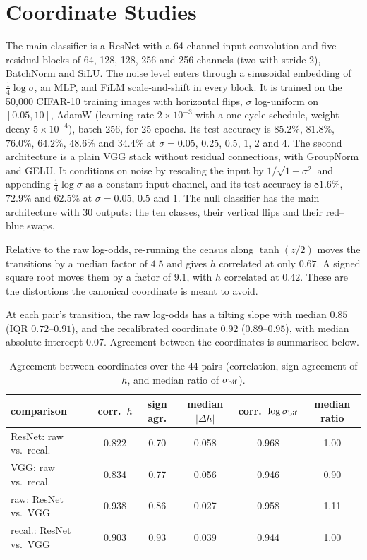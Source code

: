 \section{Coordinate Studies}
\label{app:coord}

The main classifier is a ResNet with a 64-channel input convolution and five residual blocks of 64, 128, 128, 256 and 256 channels (two with stride 2), BatchNorm and SiLU. The noise level enters through a sinusoidal embedding of $\frac14\log\sigma$, an MLP, and FiLM scale-and-shift in every block. It is trained on the 50{,}000 CIFAR-10 training images with horizontal flips, $\sigma$ log-uniform on $[0.05,10]$, AdamW (learning rate $2\times10^{-3}$ with a one-cycle schedule, weight decay $5\times10^{-4}$), batch 256, for 25 epochs. Its test accuracy is $85.2\%$, $81.8\%$, $76.0\%$, $64.2\%$, $48.6\%$ and $34.4\%$ at $\sigma=0.05$, $0.25$, $0.5$, $1$, $2$ and $4$. The second architecture is a plain VGG stack without residual connections, with GroupNorm and GELU. It conditions on noise by rescaling the input by $1/\sqrt{1+\sigma^2}$ and appending $\frac14\log\sigma$ as a constant input channel, and its test accuracy is $81.6\%$, $72.9\%$ and $62.5\%$ at $\sigma=0.05$, $0.5$ and $1$. The null classifier has the main architecture with 30 outputs: the ten classes, their vertical flips and their red–blue swaps.

Relative to the raw log-odds, re-running the census along $\tanh(z/2)$ moves the transitions by a median factor of $4.5$ and gives $h$ correlated at only $0.67$. A signed square root moves them by a factor of $9.1$, with $h$ correlated at $0.42$. These are the distortions the canonical coordinate is meant to avoid.

At each pair's transition, the raw log-odds has a tilting slope with median $0.85$ (IQR $0.72$--$0.91$), and the recalibrated coordinate $0.92$ ($0.89$--$0.95$), with median absolute intercept $0.07$. Agreement between the coordinates is summarised below.

\begin{table}[h]
\centering
\caption{Agreement between coordinates over the 44 pairs (correlation, sign agreement of $h$, and median ratio of $\sigma_{\rm bif}$).}
\small
\begin{tabular}{lccccc}
\toprule
comparison & corr.\ $h$ & sign agr. & median $|\Delta h|$ & corr.\ $\log\sigma_{\rm bif}$ & median ratio \\
\midrule
ResNet: raw vs.\ recal. & 0.822 & 0.70 & 0.058 & 0.968 & 1.00 \\
VGG: raw vs.\ recal. & 0.834 & 0.77 & 0.056 & 0.946 & 0.90 \\
raw: ResNet vs.\ VGG & 0.938 & 0.86 & 0.027 & 0.958 & 1.11 \\
recal.: ResNet vs.\ VGG & 0.903 & 0.93 & 0.039 & 0.944 & 1.00 \\
\bottomrule
\end{tabular}
\end{table}

